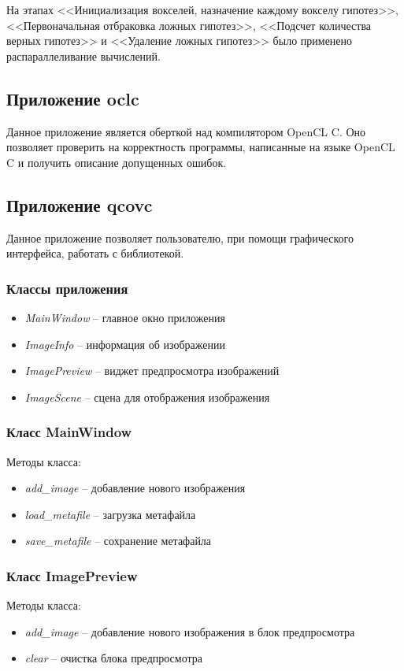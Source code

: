 На этапах <<Инициализация вокселей, назначение каждому вокселу гипотез>>, <<Первоначальная отбраковка ложных гипотез>>, <<Подсчет количества верных гипотез>> и <<Удаление ложных гипотез>> было применено распараллеливание вычислений.

\subsection{Приложение oclc}
Данное приложение является оберткой над компилятором OpenCL C. Оно позволяет проверить на корректность программы, написанные на языке OpenCL C и получить описание допущенных ошибок.

\subsection{Приложение qcovc}
Данное приложение позволяет пользователю, при помощи графического интерфейса, работать с библиотекой.

\subsubsection{Классы приложения}
\begin{itemize}
\item \textit{MainWindow} -- главное окно приложения
\item \textit{ImageInfo} -- информация об изображении
\item \textit{ImagePreview} -- виджет предпросмотра изображений
\item \textit{ImageScene} -- сцена для отображения изображения
\end{itemize}

\subsubsection{Класс MainWindow}
Методы класса:
\begin{itemize}
\item \textit{add\_image} -- добавление нового изображения
\item \textit{load\_metafile} -- загрузка метафайла
\item \textit{save\_metafile} -- сохранение метафайла
\end{itemize}

\subsubsection{Класс ImagePreview}
Методы класса:
\begin{itemize}
\item \textit{add\_image} -- добавление нового изображения в блок предпросмотра
\item \textit{clear} -- очистка блока предпросмотра
\end{itemize}

